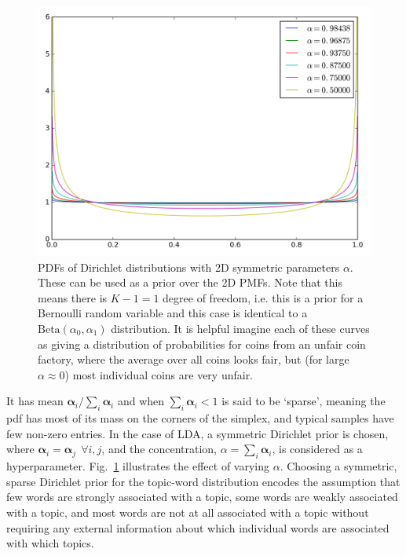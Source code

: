 \begin{figure}
	\centering
	\includegraphics[width=0.65\columnwidth]{figures/beta.png}
	\caption{
		PDFs of Dirichlet distributions with 2D symmetric parameters $\alpha$. These can be used as a prior over the 2D PMFs. Note that this means there is $K-1 = 1$ degree of freedom, i.e. this is a prior for a Bernoulli random variable and this case is identical to a $\mathrm{Beta}(\alpha_0, \alpha_1)$ distribution. It is helpful imagine each of these curves as giving a distribution of probabilities for coins from an unfair coin factory, where the average over all coins looks fair, but (for large $\alpha \approx 0$) most individual coins are very unfair.
	}
	\label{fig:beta-pdf}

\end{figure}


It has mean $\boldsymbol{\alpha}_i / \sum_i \boldsymbol{\alpha}_i$ and when $\sum_i \boldsymbol{\alpha}_i < 1$ is said to be `sparse', meaning the pdf has most of its mass on the corners of the simplex, and typical samples have few non-zero entries. In the case of LDA, a symmetric Dirichlet prior is chosen, where $\boldsymbol{\alpha}_i = \boldsymbol{\alpha}_j ~~\forall i, j$, and the concentration, $\alpha = \sum_i \boldsymbol{\alpha}_i$, is considered as a hyperparameter. Fig.~\ref{fig:beta-pdf} illustrates the effect of varying $\alpha$. Choosing a symmetric, sparse Dirichlet prior for the topic-word distribution encodes the assumption that few words are strongly associated with a topic, some words are weakly associated with a topic, and most words are not at all associated with a topic without requiring any external information about which individual words are associated with which topics.

